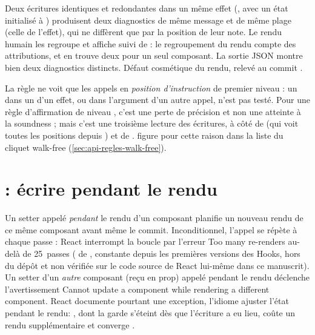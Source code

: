 \begin{remarque}
Deux écritures identiques et redondantes dans un même effet (,  avec un état initialisé à ) produisent deux diagnostics de même message et de même plage (celle de l'effet), qui ne diffèrent que par la position de leur note. Le rendu humain les regroupe et affiche \og \code{[in 2 components]}\fg{} suivi de \og {}\fg{} : le regroupement du rendu compte des attributions, et en trouve deux pour un seul composant. La sortie JSON montre bien deux diagnostics distincts. Défaut cosmétique du rendu, relevé au commit \snapshotCommit.
\end{remarque}

\begin{piege}
La règle ne voit que les appels en \emph{position d'instruction} de premier niveau : un  dans un  d'un effet, ou dans l'argument d'un autre appel, n'est pas testé. Pour une règle d'affirmation de niveau \Warning, c'est une perte de précision et non une atteinte à la soundness ; mais c'est une troisième lecture des écritures, à côté de  (qui voit toutes les positions depuis ) et de .  figure pour cette raison dans la liste du cliquet \og walk-free\fg{} (\cref{sec:api-regles-walk-free}).
\end{piege}

\section{ : écrire pendant le rendu}
\label{sec:regles-etat-setter-in-render}

\begin{react}
Un setter appelé \emph{pendant} le rendu d'un composant planifie un nouveau rendu de ce même composant avant même le commit. Inconditionnel, l'appel se répète à chaque passe : React interrompt la boucle par l'erreur \og Too many re-renders\fg{} au-delà de 25~passes ( de , constante depuis les premières versions des Hooks, hors du dépôt \reactant{} et non vérifiée sur le code source de React lui-même dans ce manuscrit).
Un setter d'un \emph{autre} composant (reçu en prop) appelé pendant le rendu déclenche l'avertissement \og Cannot update a component while rendering a different component\fg. React documente pourtant une exception, l'idiome \og ajuster l'état pendant le rendu\fg : , dont la garde s'éteint dès que l'écriture a eu lieu, coûte un rendu supplémentaire et converge \cite{ReactDocs}.
\end{react}

